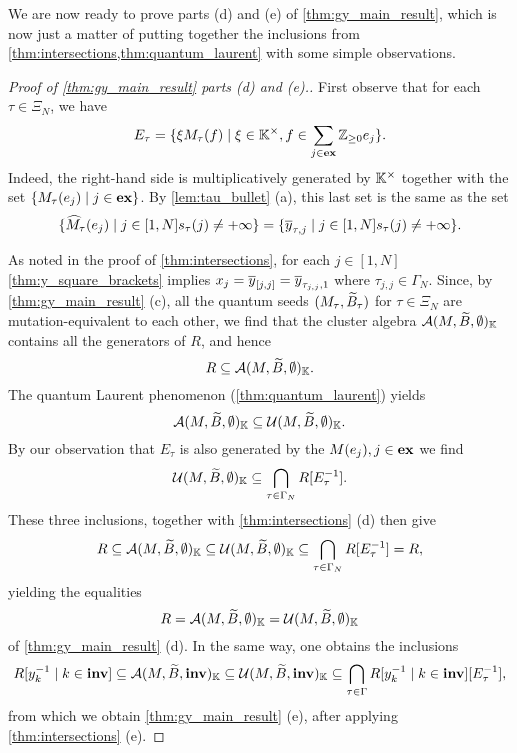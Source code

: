 We are now ready to prove parts (d) and (e) of \cref{thm:gy_main_result}, which is now
just a matter of putting together the inclusions from
\cref{thm:intersections,thm:quantum_laurent} with some simple observations.
\begin{proof}[Proof of \cref{thm:gy_main_result} parts (d) and (e).]
	First observe that for each $\tau\in \Xi_N$, we have
	\begin{equation*}
		E_\tau = \{\xi M_\tau(f) \mid \xi \in \mathbb{K}^\times, f \in \sum_{j \in \mathbf{ex}} \mathbb{Z}_{\geq 0} e_j\}.
	\end{equation*}
	Indeed, the right-hand side is multiplicatively generated by $\mathbb{K}^\times$ together
	with the set $\{ M_\tau(e_j) \mid j \in \mathbf{ex}\}$. By \cref{lem:tau_bullet} (a), this last
	set is the same as the set
	\begin{equation*}
		\{ \widehat{M}_\tau(e_j) \mid j \in [1, N] s_\tau(j) \neq + \infty\} = \{ \overline{y}_{\tau, j} \mid j \in [1, N] s_\tau(j) \neq + \infty\}.
	\end{equation*}

	As noted in the proof of \cref{thm:intersections}, for each $j \in [1, N]$
	\cref{thm:y_square_brackets} implies $x_j = \overline{y}_{[j, j]} = \overline{y}_{\tau_{j,j}, 1}$ where
	$\tau_{j,j} \in \Gamma_N$. Since, by \cref{thm:gy_main_result} (c), all the quantum
	seeds $(M_\tau, \widetilde{B}_\tau)$ for $\tau \in \Xi_N$ are mutation-equivalent to each other,
	we find that the cluster algebra $\mathcal{A}(M, \widetilde{B}, \emptyset)_{\mathbb{K}}$ contains all the
	generators of $R$, and hence
	\begin{equation*}
		R \subseteq \mathcal{A}(M, \widetilde{B}, \emptyset)_{\mathbb{K}}.
	\end{equation*}
	The quantum Laurent phenomenon (\cref{thm:quantum_laurent}) yields
	\begin{equation*}
		\mathcal{A}(M, \widetilde{B}, \emptyset)_{\mathbb{K}} \subseteq \mathcal{U} (M, \widetilde{B}, \emptyset)_{\mathbb{K}}.
	\end{equation*}
	By our observation that $E_\tau$ is also generated by the $M(e_j), j\in \mathbf{ex}$ we find
	\begin{equation*}
		\mathcal{U}(M, \widetilde{B}, \emptyset)_{\mathbb{K}} \subseteq \bigcap_{\tau \in \Gamma_N} R[E^{-1}_\tau].
	\end{equation*}
	These three inclusions, together with \cref{thm:intersections} (d) then give
	\begin{equation*}
		R \subseteq \mathcal{A}(M, \widetilde{B}, \emptyset)_{\mathbb{K}} \subseteq \mathcal{U} (M, \widetilde{B}, \emptyset)_{\mathbb{K}}\subseteq \bigcap_{\tau \in \Gamma_N} R[E^{-1}_\tau] = R,
	\end{equation*}
	yielding the equalities
	\begin{equation*}
		R = \mathcal{A}(M, \widetilde{B}, \emptyset)_{\mathbb{K}} = \mathcal{U} (M, \widetilde{B}, \emptyset)_{\mathbb{K}}
	\end{equation*}
	of \cref{thm:gy_main_result} (d). In the same way, one obtains the inclusions
	\begin{equation*}
		R[y_k^{-1} \mid k \in \mathbf{inv}] \subseteq \mathcal{A}(M, \widetilde{B}, \mathbf{inv})_{\mathbb{K}} \subseteq \mathcal{U}(M, \widetilde{B}, \mathbf{inv})_{\mathbb{K}} \subseteq \bigcap_{\tau \in \Gamma} R[y_k^{-1} \mid k \in \mathbf{inv}][E^{-1}_\tau] ,
	\end{equation*}
	from which we obtain \cref{thm:gy_main_result} (e), after applying
	\cref{thm:intersections} (e).
\end{proof}
